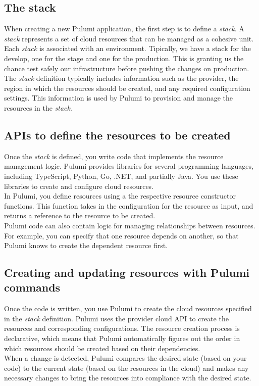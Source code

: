 \subsection{The stack}
When creating a new Pulumi application, the first step is to define a \textit{stack}.
A \textit{stack} represents a set of cloud resources that can be managed as a cohesive unit.\\
Each \textit{stack} is associated with an environment.
Tipically, we have a stack for the develop, one for the stage and one for the production.
This is granting us the chance test safely our infrastructure before pushing the changes on production.\\
The \textit{stack} definition typically includes information such as the provider, the region in which the resources should be created, and any required configuration settings.
This information is used by Pulumi to provision and manage the resources in the \textit{stack}.

\subsection{APIs to define the resources to be created}
Once the \textit{stack} is defined, you write code that implements the resource management logic.
Pulumi provides libraries for several programming languages, including TypeScript, Python, Go, .NET, and partially Java.
You use these libraries to create and configure cloud resources.\\
In Pulumi, you define resources using a the respective resource constructor functions.
This function takes in the configuration for the resource as input, and returns a reference to the resource to be created.\\
Pulumi code can also contain logic for managing relationships between resources.
For example, you can specify that one resource depends on another, so that Pulumi knows to create the dependent resource first.

\subsection{Creating and updating resources with Pulumi commands}
Once the code is written, you use Pulumi to create the cloud resources specified in the \textit{stack} definition.
Pulumi uses the provider cloud API to create the resources and corresponding configurations. 
The resource creation process is declarative, which means that Pulumi automatically figures out the order in which resources should be created based on their dependencies.\\
When a change is detected, Pulumi compares the desired state (based on your code) to the current state (based on the resources in the cloud) and makes any necessary changes to bring the resources into compliance with the desired state.

